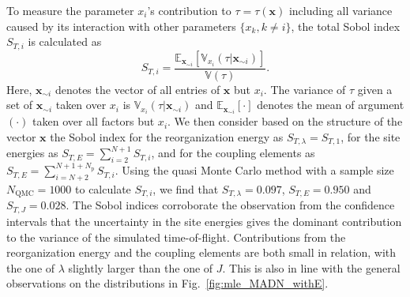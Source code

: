 \documentclass[%
 reprint,
superscriptaddress,
 amsmath,amssymb,
 aps,
prb,
floatfix
]{revtex4-2}
\begin{document}
To measure the parameter $x_i$'s contribution to $\tau=\tau(\mathbf{x})$ including all variance caused by its interaction with other parameters $\{x_k, k \neq i \}$, the total Sobol index $S_{T,i}$ is calculated as
%
\begin{equation}
    S_{T,i} = \frac{ \mathbb{E}_{\mathbf{x}_{\sim i}}[ \mathbb{V}_{x_i}(\tau|\mathbf{x}_{\sim i}) ] }{ \mathbb{V}(\tau) } .
    \label{eq:STi}
\end{equation}
%
Here, $\mathbf{x}_{\sim i}$ denotes the vector of all entries of $\mathbf{x}$ but $x_i$. The variance of $\tau$ given a set of $\mathbf{x}_{\sim i}$ taken over $x_i$ is $\mathbb{V}_{x_i}(\tau|\mathbf{x}_{\sim i})$ and $ \mathbb{E}_{\mathbf{x}_{\sim i}}[\cdot]$ denotes the mean of argument $(\cdot)$ taken over all factors but $x_i$. We then consider based on the structure of the vector $\mathbf{x}$ the Sobol index for the reorganization energy as $S_{T,\lambda} = S_{T,1}$, for the site energies as $S_{T,E} = \sum\limits_{i=2}^{N+1} S_{T,i}$, and for the coupling elements as $S_{T,E} = \sum\limits_{i=N+2}^{N+1+N_\text{p}} S_{T,i}$. Using the quasi Monte Carlo method\cite{sobol_global_2001} with a sample size $N_\text{QMC}=1000$ to calculate $S_{T,i}$, we find that $S_{T,\lambda}=0.097$, $S_{T,E} =0.950$ and $S_{T,J}=0.028$. The Sobol indices corroborate the observation from the confidence intervals that the uncertainty in the site energies gives the dominant contribution to the variance of the simulated time-of-flight. Contributions from the reorganization energy and the coupling elements are both small in relation, with the one of $\lambda$ slightly larger than the one of $J$. This is also in line with the general observations on the distributions in Fig.~\ref{fig:mle_MADN_withE}.




%
\end{document}
